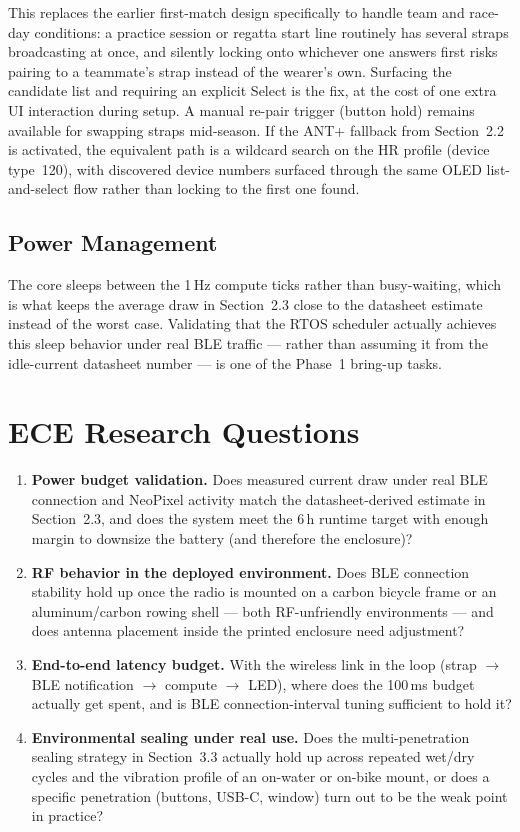 \documentclass[11pt]{article}
\begin{document}
This replaces the earlier first-match design specifically to handle team and race-day conditions: a practice session or regatta start line routinely has several straps broadcasting at once, and silently locking onto whichever one answers first risks pairing to a teammate's strap instead of the wearer's own. Surfacing the candidate list and requiring an explicit Select is the fix, at the cost of one extra UI interaction during setup. A manual re-pair trigger (button hold) remains available for swapping straps mid-season. If the ANT+ fallback from Section~2.2 is activated, the equivalent path is a wildcard search on the HR profile (device type~120), with discovered device numbers surfaced through the same OLED list-and-select flow rather than locking to the first one found.

\subsection{Power Management}
The core sleeps between the 1\,Hz compute ticks rather than busy-waiting, which is what keeps the average draw in Section~2.3 close to the datasheet estimate instead of the worst case. Validating that the RTOS scheduler actually achieves this sleep behavior under real BLE traffic --- rather than assuming it from the idle-current datasheet number --- is one of the Phase~1 bring-up tasks.

\section{ECE Research Questions}
\begin{enumerate}[topsep=2pt,itemsep=3pt]
    \item \textbf{Power budget validation.} Does measured current draw under real BLE connection and NeoPixel activity match the datasheet-derived estimate in Section~2.3, and does the system meet the 6\,h runtime target with enough margin to downsize the battery (and therefore the enclosure)?
    \item \textbf{RF behavior in the deployed environment.} Does BLE connection stability hold up once the radio is mounted on a carbon bicycle frame or an aluminum/carbon rowing shell --- both RF-unfriendly environments --- and does antenna placement inside the printed enclosure need adjustment?
    \item \textbf{End-to-end latency budget.} With the wireless link in the loop (strap $\to$ BLE notification $\to$ compute $\to$ LED), where does the 100\,ms budget actually get spent, and is BLE connection-interval tuning sufficient to hold it?
    \item \textbf{Environmental sealing under real use.} Does the multi-penetration sealing strategy in Section~3.3 actually hold up across repeated wet/dry cycles and the vibration profile of an on-water or on-bike mount, or does a specific penetration (buttons, USB-C, window) turn out to be the weak point in practice?
\end{enumerate}
\end{document}
